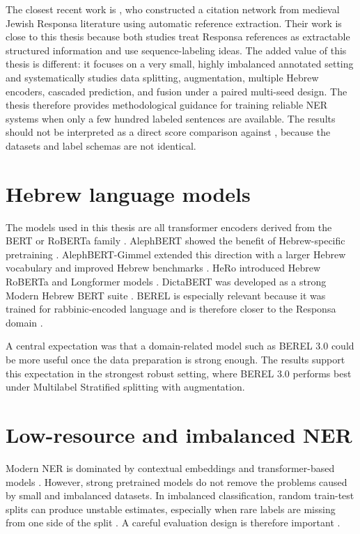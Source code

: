 \documentclass[12pt,a4paper]{report}
\begin{document}
The closest recent work is \citet{bengigi2025}, who constructed a citation network from medieval Jewish Responsa literature using automatic reference extraction. Their work is close to this thesis because both studies treat Responsa references as extractable structured information and use sequence-labeling ideas. The added value of this thesis is different: it focuses on a very small, highly imbalanced annotated setting and systematically studies data splitting, augmentation, multiple Hebrew encoders, cascaded prediction, and fusion under a paired multi-seed design. The thesis therefore provides methodological guidance for training reliable NER systems when only a few hundred labeled sentences are available. The results should not be interpreted as a direct score comparison against \citet{bengigi2025}, because the datasets and label schemas are not identical.

\section{Hebrew language models}
The models used in this thesis are all transformer encoders derived from the BERT or RoBERTa family \citep{devlin2019bert}. AlephBERT showed the benefit of Hebrew-specific pretraining \citep{seker2022alephbert}. AlephBERT-Gimmel extended this direction with a larger Hebrew vocabulary and improved Hebrew benchmarks \citep{gueta2023alephgimmel}. HeRo introduced Hebrew RoBERTa and Longformer models \citep{shalumov2023hero}. DictaBERT was developed as a strong Modern Hebrew BERT suite \citep{shmidman2023dictabert}. BEREL is especially relevant because it was trained for rabbinic-encoded language and is therefore closer to the Responsa domain \citep{shmidman2022berel}.

A central expectation was that a domain-related model such as BEREL 3.0 could be more useful once the data preparation is strong enough. The results support this expectation in the strongest robust setting, where BEREL 3.0 performs best under Multilabel Stratified splitting with augmentation.

\section{Low-resource and imbalanced NER}
Modern NER is dominated by contextual embeddings and transformer-based models \citep{li2022ner,hu2024ner,keraghel2024ner}. However, strong pretrained models do not remove the problems caused by small and imbalanced datasets. In imbalanced classification, random train-test splits can produce unstable estimates, especially when rare labels are missing from one side of the split \citep{japkowicz2002}. A careful evaluation design is therefore important \citep{kohavi1995,pineau2021}.
\end{document}
